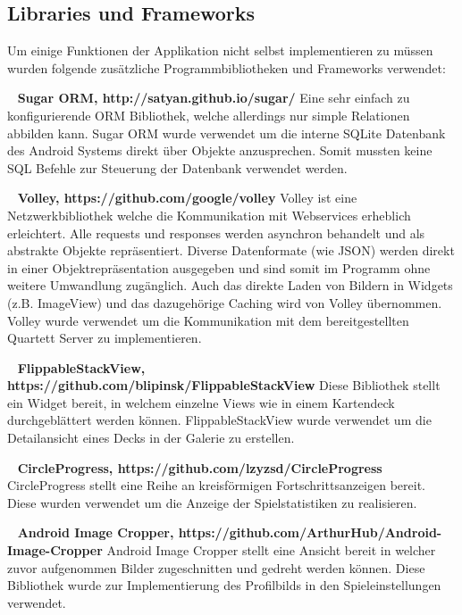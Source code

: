 \documentclass{scrartcl}
\begin{document}
\subsection{Libraries und Frameworks}
Um einige Funktionen der Applikation nicht selbst implementieren zu müssen
wurden folgende zusätzliche Programmbibliotheken und Frameworks verwendet:

\noindent
\ \newline
\textbf{Sugar ORM, http://satyan.github.io/sugar/} \newline
Eine sehr einfach zu konfigurierende ORM Bibliothek, welche allerdings nur
simple Relationen abbilden kann. Sugar ORM wurde verwendet um die interne SQLite
Datenbank des Android Systems direkt über Objekte anzusprechen. Somit mussten
keine SQL Befehle zur Steuerung der Datenbank verwendet werden.

\ \newline
\textbf{Volley, https://github.com/google/volley} \newline
Volley ist eine Netzwerkbibliothek welche die Kommunikation mit Webservices
erheblich erleichtert. Alle requests und responses werden asynchron behandelt
und als abstrakte Objekte repräsentiert. Diverse Datenformate (wie JSON) werden
direkt in einer Objektrepräsentation ausgegeben und sind somit im Programm ohne
weitere Umwandlung zugänglich. Auch das direkte Laden von Bildern in Widgets
(z.B. ImageView) und das dazugehörige Caching wird von Volley übernommen. Volley
wurde verwendet um die Kommunikation mit dem bereitgestellten Quartett Server zu
implementieren.

\ \newline
\textbf{FlippableStackView, https://github.com/blipinsk/FlippableStackView} \newline
Diese Bibliothek stellt ein Widget bereit, in welchem einzelne Views wie in
einem Kartendeck durchgeblättert werden können. FlippableStackView wurde
verwendet um die Detailansicht eines Decks in der Galerie zu erstellen.

\ \newline
\textbf{CircleProgress, https://github.com/lzyzsd/CircleProgress} \newline
CircleProgress stellt eine Reihe an kreisförmigen Fortschrittsanzeigen bereit.
Diese wurden verwendet um die Anzeige der Spielstatistiken zu realisieren.

\newpage
\ \newline
\textbf{Android Image Cropper, https://github.com/ArthurHub/Android-Image-Cropper} \newline
Android Image Cropper stellt eine Ansicht bereit in welcher zuvor aufgenommen
Bilder zugeschnitten und gedreht werden können. Diese Bibliothek wurde zur
Implementierung des Profilbilds in den Spieleinstellungen verwendet.
\end{document}
